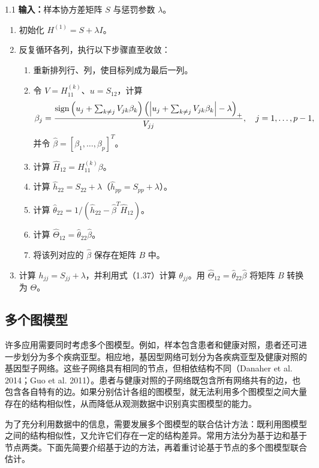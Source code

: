 \begin{bookalgorithm}{1.1}
\textbf{输入：}样本协方差矩阵 $S$ 与惩罚参数 $\lambda$。
\begin{enumerate}[label=\arabic*.]
\item 初始化 $H^{(1)}=S+\lambda I$。
\item 反复循环各列，执行以下步骤直至收敛：
\begin{enumerate}[label=\alph*.]
\item 重新排列行、列，使目标列成为最后一列。
\item 令 $V=H_{11}^{(k)}$、$u=S_{12}$，计算
\[
\beta_j=\frac{\operatorname{sign}\left(u_j+\sum_{k\ne j}V_{jk}\beta_k\right)
\left(\left|u_j+\sum_{k\ne j}V_{jk}\beta_k\right|-\lambda\right)_+}{V_{jj}},
\quad j=1,\ldots,p-1,
\]
并令 $\widehat\beta=[\beta_1,\ldots,\beta_p]^T$。
\item 计算 $\widehat H_{12}=H_{11}^{(k)}\beta$。
\item 计算 $\widehat h_{22}=S_{22}+\lambda$（$\widehat h_{pp}=S_{pp}+\lambda$）。
\item 计算 $\widehat\theta_{22}=1/(\widehat h_{22}-\widehat\beta^T\widehat H_{12})$。
\item 计算 $\widehat\Theta_{12}=\widehat\theta_{22}\widehat\beta$。
\item 将该列对应的 $\widehat\beta$ 保存在矩阵 $B$ 中。
\end{enumerate}
\item 计算 $h_{jj}=S_{jj}+\lambda$，并利用式（1.37）计算 $\theta_{jj}$。用 $\widehat\Theta_{12}=\widehat\theta_{22}\widehat\beta$ 将矩阵 $B$ 转换为 $\Theta$。
\end{enumerate}
\end{bookalgorithm}

\subsection{多个图模型}

许多应用需要同时考虑多个图模型。例如，样本包含患者和健康对照，患者还可进一步划分为多个疾病亚型。相应地，基因型网络可划分为各疾病亚型及健康对照的基因型子网络。这些子网络具有相同的节点，但相依结构不同（Danaher et al. 2014；Guo et al. 2011）。患者与健康对照的子网络既包含所有网络共有的边，也包含各自特有的边。如果分别估计各组的图模型，就无法利用多个图模型之间大量存在的结构相似性，从而降低从观测数据中识别真实图模型的能力。

为了充分利用数据中的信息，需要发展多个图模型的联合估计方法：既利用图模型之间的结构相似性，又允许它们存在一定的结构差异。常用方法分为基于边和基于节点两类。下面先简要介绍基于边的方法，再着重讨论基于节点的多个图模型联合估计。

